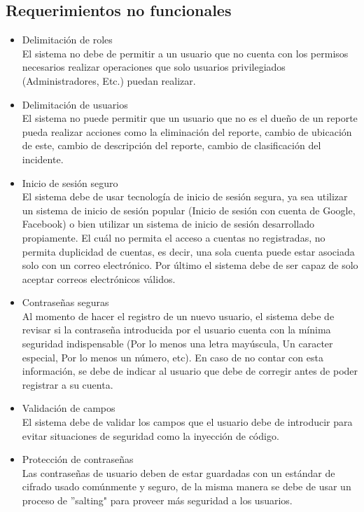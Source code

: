 \subsection{Requerimientos no funcionales}
\begin{itemize}
    \item Delimitación de roles\\
    El sistema no debe de permitir a un usuario que no cuenta con los permisos necesarios realizar operaciones que solo usuarios privilegiados (Administradores, Etc.) puedan realizar.
    \item Delimitación de usuarios\\
    El sistema no puede permitir que un usuario que no es el dueño de un reporte pueda realizar acciones como la eliminación del reporte, cambio de ubicación de este, cambio de descripción del reporte, cambio de clasificación del incidente.
    \item Inicio de sesión seguro\\
    El sistema debe de usar tecnología de inicio de sesión segura, ya sea utilizar un sistema de inicio de sesión popular (Inicio de sesión con cuenta de Google, Facebook) o bien utilizar un sistema de inicio de sesión desarrollado propiamente. El cuál no permita el acceso a cuentas no registradas, no permita duplicidad de cuentas, es decir, una sola cuenta puede estar asociada solo con un correo electrónico. Por último el sistema debe de ser capaz de solo aceptar correos electrónicos válidos.
    \item Contraseñas seguras\\
    Al momento de hacer el registro de un nuevo usuario, el sistema debe de revisar si la contraseña introducida por el usuario cuenta con la mínima seguridad indispensable (Por lo menos una letra mayúscula, Un caracter especial, Por lo menos un número, etc). En caso de no contar con esta información, se debe de indicar al usuario que debe de corregir antes de poder registrar a su cuenta.
    \item Validación de campos\\
    El sistema debe de validar los campos que el usuario debe de introducir para evitar situaciones de seguridad como la inyección de código.
    \item Protección de contraseñas\\
    Las contraseñas de usuario deben de estar guardadas con un estándar de cifrado usado comúnmente y seguro, de la misma manera se debe de usar un proceso de ''salting" para proveer más seguridad a los usuarios.
\end{itemize}

